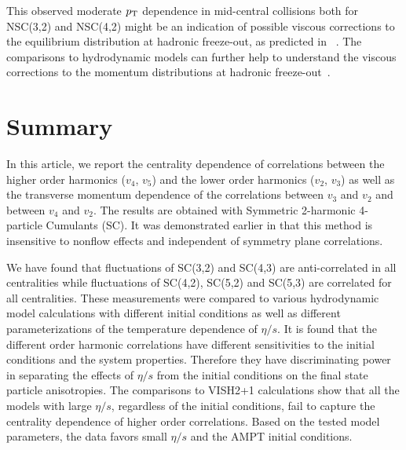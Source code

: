 This observed moderate $p_{\rm T}$ dependence in mid-central collisions both for NSC(3,2) and NSC(4,2) might be an indication of possible viscous corrections to the equilibrium distribution at hadronic freeze-out, as predicted in ~\cite{Niemi:2012aj}.
The comparisons to hydrodynamic models can further help to understand the viscous corrections to the momentum distributions at hadronic freeze-out~\cite{Dusling:2009df,Luzum:2010ad,Teaney:2012ke,Molnar:2014fva,Niemi:2015qia}.


 
\section{Summary}
\label{sec:summary}
In this article, we report the centrality dependence of correlations between the higher order harmonics ($v_4$, $v_5$) and the lower order harmonics ($v_2$, $v_3$) as well as the transverse momentum dependence of the correlations between $v_3$ and $v_2$ and between $v_4$ and $v_2$.
The results are obtained with Symmetric 2-harmonic 4-particle Cumulants (SC). It was demonstrated earlier in \cite{ALICE:2016kpq} that this method is insensitive to nonflow effects and independent of symmetry plane correlations.

We have found that fluctuations of SC(3,2) and SC(4,3) are anti-correlated in all centralities while fluctuations of SC(4,2), SC(5,2) and SC(5,3) are correlated for all centralities. 
These measurements were compared to various hydrodynamic model calculations with different initial conditions as well as different parameterizations of the temperature dependence of $\eta/s$.
It is found that the different order harmonic correlations have different sensitivities to the initial conditions and the system properties. Therefore they have discriminating power in separating the effects of $\eta/s$  from the initial conditions on the final state particle anisotropies.
The comparisons to VISH2+1 calculations show that all the models with large $\eta/s$, regardless of the initial conditions, fail to capture the centrality dependence of higher order correlations. 
Based on the tested model parameters, the data favors small $\eta/s$ and the AMPT initial conditions. 

